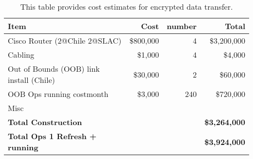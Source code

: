 \tiny \begin{longtable} {|l|r|r|r|} \caption{This table provides cost estimates for encrypted data transfer. \label{tab:ipsec}}\\ 
\hline 
\textbf{Item}&\textbf{Cost}&\textbf{number}&\textbf{Total} \\ \hline
{Cisco Router (2@Chile 2@SLAC)}&{\$800,000}&{4}&{\$3,200,000} \\ \hline
{Cabling}&{\$1,000}&{4}&{\$4,000} \\ \hline
{Out of Bounds (OOB) link  install (Chile)}&{\$30,000}&{2}&{\$60,000} \\ \hline
{OOB Ops running cost\/month}&{\$3,000}&{240}&{\$720,000} \\ \hline
{Misc}&&& \\ \hline
\textbf{Total Construction}&\textbf{}&\textbf{}&\textbf{\$3,264,000} \\ \hline
\textbf{Total Ops 1 Refresh  + running }&\textbf{}&\textbf{}&\textbf{\$3,924,000} \\ \hline
\end{longtable} \normalsize
